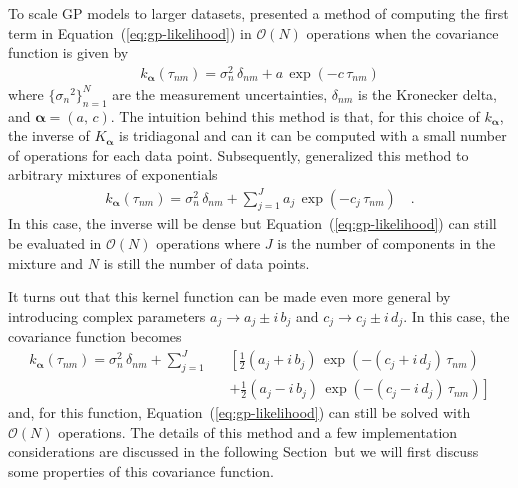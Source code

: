 \documentclass[manuscript, letterpaper]{aastex6}
\renewcommand{\eqref}[1]{\ref{eq:#1}}
\newcommand{\Eq}[1]{Equation~(\eqref{#1})}
\newcommand{\eq}[1]{\Eq{#1}}
\newcommand{\eqlabel}[1]{\label{eq:#1}}
\newcommand{\sectionname}{Section}
\newcommand{\bvec}[1]{{\ensuremath{\boldsymbol{#1}}}}
\begin{document}
To scale GP models to larger datasets, \citet{Rybicki:1995} presented a method
of computing the first term in \eq{gp-likelihood} in $\mathcal{O}(N)$
operations when the covariance function is given by
\begin{eqnarray}\eqlabel{kernel-simple}
k_\bvec{\alpha}(\tau_{nm}) = \sigma_n^2\,\delta_{nm} + a\,\exp(-c\,\tau_{nm})
\end{eqnarray}
where $\{{\sigma_n}^2\}_{n=1}^N$ are the measurement uncertainties,
$\delta_{nm}$ is the Kronecker delta, and $\bvec{\alpha} = (a,\,c)$.
The intuition behind this method is that, for this choice of $k_\bvec{\alpha}$,
the inverse of $K_\bvec{\alpha}$ is tridiagonal and can it can be computed
with a small number of operations for each data point.
Subsequently, \citet{Ambikasaran:2015} generalized this method to arbitrary
mixtures of exponentials
\begin{eqnarray}
k_\bvec{\alpha}(\tau_{nm}) = \sigma_n^2\,\delta_{nm} +
    \sum_{j=1}^J a_j\,\exp(-c_j\,\tau_{nm})\quad.
\end{eqnarray}
In this case, the inverse will be dense but \eq{gp-likelihood} can still be
evaluated in $\mathcal{O}(N)$ operations where $J$ is the number of components
in the mixture and $N$ is still the number of data points.

It turns out that this kernel function can be made even more general by
introducing complex parameters $a_j \to a_j\pm i\,b_j$ and
$c_j \to c_j\pm i\,d_j$.
In this case, the covariance function becomes
\begin{eqnarray}\eqlabel{celerite-kernel-complex}
k_\bvec{\alpha}(\tau_{nm}) = \sigma_n^2\,\delta_{nm} +
    \sum_{j=1}^J &&\left[
    \frac{1}{2}(a_j + i\,b_j)\,\exp\left(-(c_j+i\,d_j)\,\tau_{nm}\right)
        \right. \nonumber\\
    &&+\left.
    \frac{1}{2}(a_j - i\,b_j)\,\exp\left(-(c_j-i\,d_j)\,\tau_{nm}\right)
\right]
\end{eqnarray}
and, for this function, \eq{gp-likelihood} can still be solved with
$\mathcal{O}(N)$ operations.
The details of this method and a few implementation considerations are
discussed in the following \sectionname\ but we will first discuss some
properties of this covariance function.
\end{document}
